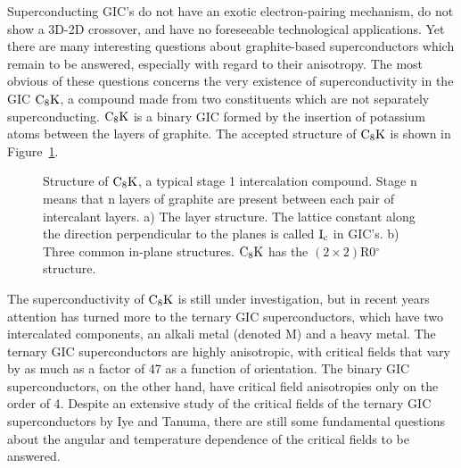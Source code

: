         Superconducting  GIC's do  not  have   an  exotic  electron-pairing
mechanism,  do not  show  a  3D-2D crossover,  and   have  no   foreseeable
technological applications.  Yet there are many interesting questions about
graphite-based superconductors which remain to be answered, especially with
regard to their anisotropy.  The  most obvious of  these questions concerns
the    very      existence   of  superconductivity    in     the   GIC $\rm
C_8K$,\cite{hannay65} a compound made  from two  constituents which are not
separately superconducting.   $\rm  C_8K$  is  a binary GIC  formed by  the
insertion of potassium atoms between the layers  of graphite.  The accepted
structure of $\rm C_8K$ is shown in Figure~\ref{c8kstruct}.

\begin{figure}
\vspace{15cm}
\caption[Structure of $\rm C_8K$]{Structure of $\rm C_8K$, a typical stage 1
intercalation  compound.   Stage n means that  n  layers  of  graphite  are
present between each  pair  of  intercalant layers.\cite{I94} a)  The layer
structure.  The lattice constant along the  direction  perpendicular to the
planes is called $\rm I_c$ in GIC's.  b) Three  common in-plane structures.
$\rm C_8K$ has the $(2 \times 2)$R0$^{\circ}$ structure.}
\label{c8kstruct}
\end{figure}

        The   superconductivity     of    $\rm   C_8K$    is still    under
investigation,\cite{aljishi88} but  in recent   years attention  has turned
more  to  the ternary   GIC superconductors,  which have   two intercalated
components, an alkali metal (denoted M) and a heavy metal.  The ternary GIC
superconductors are highly anisotropic,  with critical  fields that vary by
as much  as a factor  of 47 as  a function of orientation.\cite{iye83a} The
binary  GIC  superconductors, on   the   other hand,  have  critical  field
anisotropies only on the  order of 4.\cite{koike80}  Despite  an  extensive
study of the critical fields of the ternary GIC  superconductors by Iye and
Tanuma,\cite{iye82}  there  are still some  fundamental questions about the
angular and temperature dependence of the critical fields to be answered.

